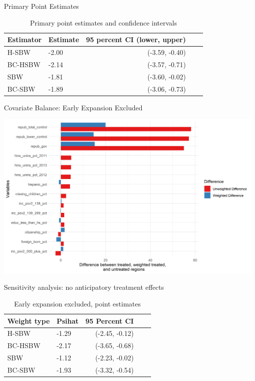 \documentclass[hyperref={pdfpagelabels=false}]{beamer}
\begin{document}
\begin{frame}{Primary Point Estimates}

\begin{table}[ht]
\begin{tabular}{llrll}
  \toprule
Estimator & Estimate & 95 percent CI (lower, upper)\\ 
  \midrule
  H-SBW & -2.00 & (-3.59, -0.40) \\ 
  BC-HSBW & -2.14 & (-3.57, -0.71) \\ 
  SBW & -1.81 & (-3.60, -0.02) \\ 
  BC-SBW & -1.89 & (-3.06, -0.73) \\ 
   \bottomrule
\end{tabular}
\caption{Primary point estimates and confidence intervals}
\label{tab:confintmain}
\end{table}
\end{frame}

\begin{frame}{Covariate Balance: Early Expansion Excluded}
    \begin{center}
	\includegraphics[scale=0.5]{01_Plots/balance-plot-etuc2.png}
    \end{center}
\end{frame}

\begin{frame}{Sensitivity analysis: no anticipatory treatment effects}
    \begin{table}[ht]
\centering
\begin{tabular}{llrll}
  \toprule
Weight type & Psihat & 95 Percent CI \\ 
  \midrule
H-SBW & -1.29 & (-2.45, -0.12) \\ 
BC-HSBW & -2.17 & (-3.65, -0.68) \\ 
SBW & -1.12 & (-2.23, -0.02) \\ 
BC-SBW & -1.93 & (-3.32, -0.54) \\ 
   \bottomrule
\end{tabular}
\caption{Early expansion excluded, point estimates}
\label{tab:confintmainc2}
\end{table}
\end{frame}
\end{document}
